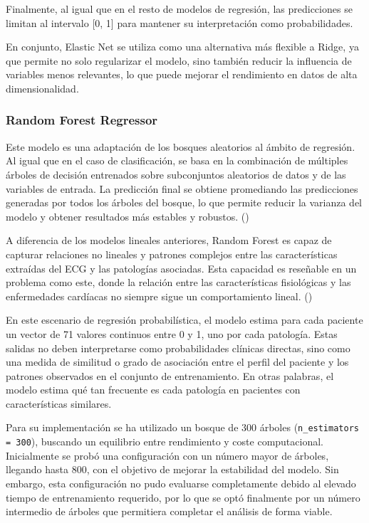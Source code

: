 \documentclass[12pt,a4paper,twoside]{book}
\begin{document}
Finalmente, al igual que en el resto de modelos de regresión, las predicciones se limitan al intervalo [0, 1] para mantener su interpretación como probabilidades.

En conjunto, Elastic Net se utiliza como una alternativa más flexible a Ridge, ya que permite no solo regularizar el modelo, sino también reducir la influencia de variables menos relevantes, lo que puede mejorar el rendimiento en datos de alta dimensionalidad.

\subsubsection*{Random Forest Regressor}

Este modelo es una adaptación de los bosques aleatorios al ámbito de regresión.
Al igual que en el caso de clasificación, se basa en la combinación de múltiples árboles de decisión entrenados sobre subconjuntos aleatorios de datos y de las variables de entrada. 
La predicción final se obtiene promediando las predicciones generadas por todos los árboles del bosque, lo que permite reducir la varianza del modelo y obtener resultados más estables y robustos. (\cite{geeksforgeeks_rf_regression_ml})

A diferencia de los modelos lineales anteriores, Random Forest es capaz de capturar relaciones no lineales y patrones complejos entre las características extraídas del ECG y las patologías asociadas. 
Esta capacidad es reseñable en un problema como este, donde la relación entre las características fisiológicas y las enfermedades cardíacas no siempre sigue un comportamiento lineal. (\cite{prathik2025_rf_regressor})

En este escenario de regresión probabilística, el modelo estima para cada paciente un vector de 71 valores continuos entre 0 y 1, uno por cada patología. 
Estas salidas no deben interpretarse como probabilidades clínicas directas, sino como una medida de similitud o grado de asociación entre el perfil del paciente y los patrones observados en el conjunto de entrenamiento. 
En otras palabras, el modelo estima qué tan frecuente es cada patología en pacientes con características similares.

Para su implementación se ha utilizado un bosque de 300 árboles (\texttt{n\_estimators = 300}), buscando un equilibrio entre rendimiento y coste computacional. 
Inicialmente se probó una configuración con un número mayor de árboles, llegando hasta 800, con el objetivo de mejorar la estabilidad del modelo. 
Sin embargo, esta configuración no pudo evaluarse completamente debido al elevado tiempo de entrenamiento requerido, por lo que se optó finalmente por un número intermedio de árboles que permitiera completar el análisis de forma viable.
\end{document}
